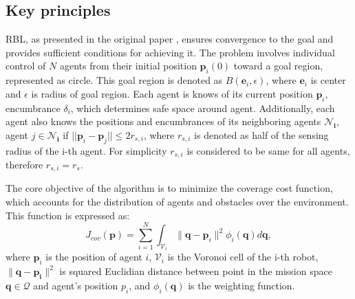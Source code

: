     \subsection{Key principles}
        RBL, as presented in the original paper \cite{rbl_paper}, ensures convergence to the goal and provides sufficient conditions for achieving it. 
        The problem involves individual control of $N$ agents from their initial position $\mathbf{p}_i(0)$ toward a goal region, represented as circle.
        This goal region is denoted as $B(\mathbf{e}_i, \epsilon)$, where $\mathbf{e}_i$ is center and $\epsilon$ is radius of goal region.
        Each agent is knows of its current position $\mathbf{p}_i$, encumbrance $\delta_i$, which determines safe space around agent.
        Additionally, each agent also knows the positions and encumbrances of its neighboring agents $\mathbf{\mathcal{N}_i}$, agent $j \in \mathbf{\mathcal{N}_i}$ if $||\mathbf{p}_i - \mathbf{p}_j|| \leq 2r_{s,i}$, where $r_{s,i}$ is denoted as half of the sensing radius of the i-th agent.
        For simplicity $r_{s,i}$ is considered to be same for all agents, therefore $r_{s,i} = r_s$. 

        The core objective of the algorithm is to minimize the coverage cost function, which accounts for the distribution of agents and obstacles over the environment. 
        This function is expressed as:
        \begin{equation}
            J_{cov}(\mathbf{p}) = \sum_{i=1}^{N} \int_{\mathcal{V}_i} \lVert\mathbf{q}-\mathbf{p}_i\rVert^2 \phi_i (\mathbf{q})d\mathbf{q},
            \label{coverage_cost_function}
        \end{equation}
        where $\mathbf{p}_i$ is the position of agent $i$, $\mathcal{V}_i$ is the Voronoi cell of the i-th robot, $\lVert\mathbf{q}-\mathbf{p_i}\rVert^2$ is squared Euclidian distance between point in the mission space $\mathbf{q} \in \mathcal{Q}$ and agent's position $p_i$, 
        and $\phi_i (\mathbf{q})$ is the weighting function.

